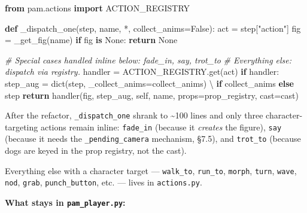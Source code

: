 \documentclass[
  11pt,
]{book}
\newenvironment{Shaded}{}{}
\newcommand{\BuiltInTok}[1]{\textcolor[rgb]{0.00,0.50,0.00}{#1}}
\newcommand{\CommentTok}[1]{\textcolor[rgb]{0.38,0.63,0.69}{\textit{#1}}}
\newcommand{\ControlFlowTok}[1]{\textcolor[rgb]{0.00,0.44,0.13}{\textbf{#1}}}
\newcommand{\ImportTok}[1]{\textcolor[rgb]{0.00,0.50,0.00}{\textbf{#1}}}
\newcommand{\KeywordTok}[1]{\textcolor[rgb]{0.00,0.44,0.13}{\textbf{#1}}}
\newcommand{\NormalTok}[1]{#1}
\newcommand{\OperatorTok}[1]{\textcolor[rgb]{0.40,0.40,0.40}{#1}}
\newcommand{\StringTok}[1]{\textcolor[rgb]{0.25,0.44,0.63}{#1}}
\newcommand{\VariableTok}[1]{\textcolor[rgb]{0.10,0.09,0.49}{#1}}
\begin{document}
\begin{Shaded}
\begin{Highlighting}[]
\ImportTok{from}\NormalTok{ pam.actions }\ImportTok{import}\NormalTok{ ACTION\_REGISTRY}

\KeywordTok{def}\NormalTok{ \_dispatch\_one(step, name, }\OperatorTok{*}\NormalTok{, collect\_anims}\OperatorTok{=}\VariableTok{False}\NormalTok{):}
\NormalTok{    act }\OperatorTok{=}\NormalTok{ step[}\StringTok{"action"}\NormalTok{]}
\NormalTok{    fig }\OperatorTok{=}\NormalTok{ \_get\_fig(name)}
    \ControlFlowTok{if}\NormalTok{ fig }\KeywordTok{is} \VariableTok{None}\NormalTok{:}
        \ControlFlowTok{return} \VariableTok{None}

    \CommentTok{\# Special cases handled inline below: fade\_in, say, trot\_to}
    \CommentTok{\# Everything else: dispatch via registry.}
\NormalTok{    handler }\OperatorTok{=}\NormalTok{ ACTION\_REGISTRY.get(act)}
    \ControlFlowTok{if}\NormalTok{ handler:}
\NormalTok{        step\_aug }\OperatorTok{=} \BuiltInTok{dict}\NormalTok{(step, \_collect\_anims}\OperatorTok{=}\NormalTok{collect\_anims) }\OperatorTok{\textbackslash{}}
                   \ControlFlowTok{if}\NormalTok{ collect\_anims }\ControlFlowTok{else}\NormalTok{ step}
        \ControlFlowTok{return}\NormalTok{ handler(fig, step\_aug, }\VariableTok{self}\NormalTok{, name,}
\NormalTok{                       props}\OperatorTok{=}\NormalTok{prop\_registry, cast}\OperatorTok{=}\NormalTok{cast)}
\end{Highlighting}
\end{Shaded}

After the refactor, \texttt{\_dispatch\_one} shrank to
\textasciitilde100 lines and only three character-targeting actions
remain inline: \texttt{fade\_in} (because it \emph{creates} the figure),
\texttt{say} (because it needs the \texttt{\_pending\_camera} mechanism,
§7.5), and \texttt{trot\_to} (because dogs are keyed in the prop
registry, not the cast).

Everything else with a character target --- \texttt{walk\_to},
\texttt{run\_to}, \texttt{morph}, \texttt{turn}, \texttt{wave},
\texttt{nod}, \texttt{grab}, \texttt{punch\_button}, etc. --- lives in
\texttt{actions.py}.

\textbf{What stays in \texttt{pam\_player.py}:}
\end{document}
